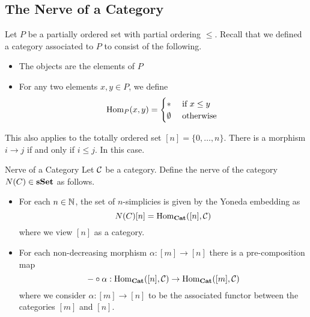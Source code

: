 \documentclass[a4paper]{article}
\begin{document}
\subsection{The Nerve of a Category}
Let $P$ be a partially ordered set with partial ordering $\leq$. Recall that we defined a category associated to $P$ to consist of the following. 
\begin{itemize}
\item The objects are the elements of $P$
\item For any two elements $x,y\in P$, we define $$\operatorname{Hom}_P(x,y)=\begin{cases}
\ast & \text{ if }x\leq y\\
\emptyset & \text{ otherwise }
\end{cases}$$
\end{itemize}

This also applies to the totally ordered set $[n]=\{0,\dots,n\}$. There is a morphism $i\to j$ if and only if $i\leq j$. In this case. 

\begin{defn}{Nerve of a Category}{} Let $\mathcal{C}$ be a category. Define the nerve of the category $N(C)\in\bold{sSet}$ as follows. 
\begin{itemize}
\item For each $n\in\mathbb{N}$, the set of $n$-simplicies is given by the Yoneda embedding as $$N(C)[n]=\operatorname{Hom}_\bold{Cat}([n],\mathcal{C})$$ where we view $[n]$ as a category. 
\item For each non-decreasing morphism $\alpha:[m]\to[n]$ there is a pre-composition map $$-\circ\alpha:\operatorname{Hom}_\bold{Cat}([n],\mathcal{C})\to\operatorname{Hom}_\bold{Cat}([m],\mathcal{C})$$ where we consider $\alpha:[m]\to[n]$ to be the associated functor between the categories $[m]$ and $[n]$. 
\end{itemize}
\end{defn}
\end{document}
